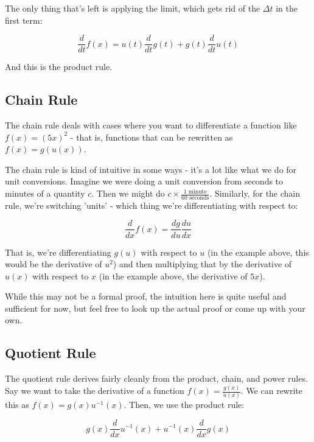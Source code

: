 The only thing that's left is applying the limit, which gets rid of the $\Delta t$ in the first term:

\begin{equation*}
    \frac{d}{dt}f(x) = u(t)\frac{d}{dt}g(t)+g(t)\frac{d}{dt}u(t)
\end{equation*}

And this is the product rule.

\subsection{Chain Rule}

The chain rule deals with cases where you want to differentiate a function like $f(x) = (5x)^2$ - that is, functions that can be rewritten as $f(x) = g(u(x))$.

The chain rule is kind of intuitive in some ways - it's a lot like what we do for unit conversions. Imagine we were doing a unit conversion from seconds to minutes of a quantity $c$. Then we might do $c\times\frac{1\text{ minute}}{60\text{ seconds}}$. Similarly, for the chain rule, we're switching 'units' - which thing we're differentiating with respect to:

\begin{equation*}
    \frac{d}{dx}f(x) = \frac{dg}{du}\frac{du}{dx}
\end{equation*}

That is, we're differentiating $g(u)$ with respect to $u$ (in the example above, this would be the derivative of $u^2$) and then multiplying that by the derivative of $u(x)$ with respect to $x$ (in the example above, the derivative of $5x$).

While this may not be a formal proof, the intuition here is quite useful and sufficient for now, but feel free to look up the actual proof or come up with your own.

\subsection{Quotient Rule}

The quotient rule derives fairly cleanly from the product, chain, and power rules. Say we want to take the derivative of a function $f(x) = \frac{g(x)}{u(x)}$. We can rewrite this as $f(x) = g(x)u^{-1}(x)$. Then, we use the product rule:

\begin{equation*}
    g(x)\frac{d}{dx}u^{-1}(x) + u^{-1}(x)\frac{d}{dx}g(x)
\end{equation*}

